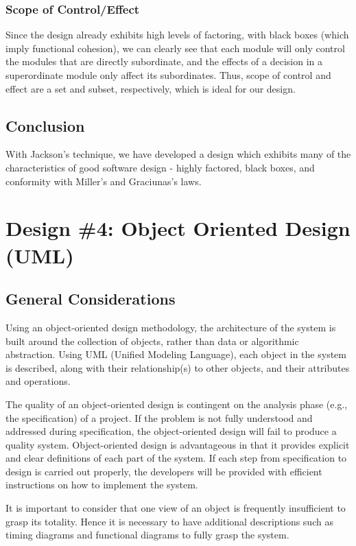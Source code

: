 \documentclass{article}
\begin{document}
		\subsubsection{Scope of Control/Effect}
			Since the design already exhibits high levels of factoring, with black boxes (which imply functional cohesion), we can clearly see that each module will only control the modules that are directly subordinate, and the effects of a decision in a superordinate module only affect its subordinates. Thus, scope of control and effect are a set and subset, respectively, which is ideal for our design. 
	\subsection{Conclusion}
		With Jackson's technique, we have developed a design which exhibits many of the characteristics of good software design - highly factored, black boxes, and conformity with Miller's and Graciunas's laws.  
%
%
\section{Design \#4: Object Oriented Design (UML)}
	\subsection{General Considerations}
		Using an object-oriented design methodology, the architecture of the system is built around the collection of objects, rather than data or algorithmic abstraction. Using UML (Unified Modeling Language), each object in the system is described, along with their relationship(s) to other objects, and their attributes and operations. 
		
		The quality of an object-oriented design is contingent on the analysis phase (e.g., the specification) of a project. If the problem is not fully understood and addressed during specification, the object-oriented design will fail to produce a quality system. Object-oriented design is advantageous in that it provides explicit and clear definitions of each part of the system. If each step from specification to design is carried out properly, the developers will be provided with efficient instructions on how to implement the system.
		
		It is important to consider that one view of an object is frequently insufficient to grasp its totality. Hence it is necessary to have additional descriptions such as timing diagrams and functional diagrams to fully grasp the system. 
\end{document}

